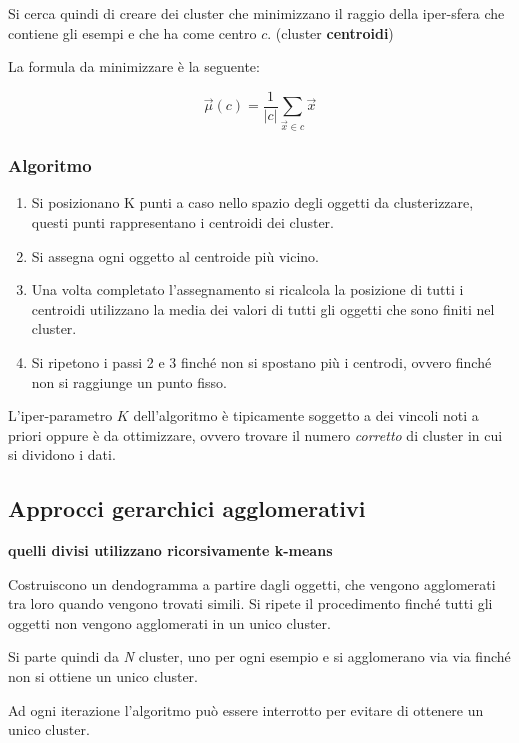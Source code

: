 Si cerca quindi di creare dei cluster che minimizzano il raggio della
iper-sfera che contiene gli esempi e che ha come centro $c$. (cluster \textbf{centroidi})

La formula da minimizzare è la seguente:

$$
\vec{\mu}(c) = \frac{1}{|c|}\sum_{\vec{x} \in c} \vec{x}
$$

\subsubsection{Algoritmo}\label{algoritmo}

\begin{enumerate}
\item
  Si posizionano K punti a caso nello spazio degli oggetti da
  clusterizzare, questi punti rappresentano i centroidi dei cluster.
\item
  Si assegna ogni oggetto al centroide più vicino.
\item
  Una volta completato l'assegnamento si ricalcola la posizione di tutti
  i centroidi utilizzano la media dei valori di tutti gli oggetti che
  sono finiti nel cluster.
\item
  Si ripetono i passi 2 e 3 finché non si spostano più i centrodi, ovvero finché non si raggiunge un punto fisso.
\end{enumerate}

L'iper-parametro $K$ dell'algoritmo è tipicamente soggetto a dei vincoli noti a priori oppure è da ottimizzare, ovvero trovare il numero \textit{corretto} di cluster in cui si dividono i dati.

\subsection{Approcci gerarchici agglomerativi}\label{approcci-gerarchici-agglormerativi}

\textbf{quelli divisi utilizzano ricorsivamente k-means}

Costruiscono un dendogramma a partire dagli oggetti, che vengono
agglomerati tra loro quando vengono trovati simili. Si ripete il
procedimento finché tutti gli oggetti non vengono agglomerati in un
unico cluster.

Si parte quindi da \textit{N} cluster, uno per ogni esempio e si agglomerano via
via finché non si ottiene un unico cluster.

Ad ogni iterazione l'algoritmo può essere interrotto per evitare di
ottenere un unico cluster.

